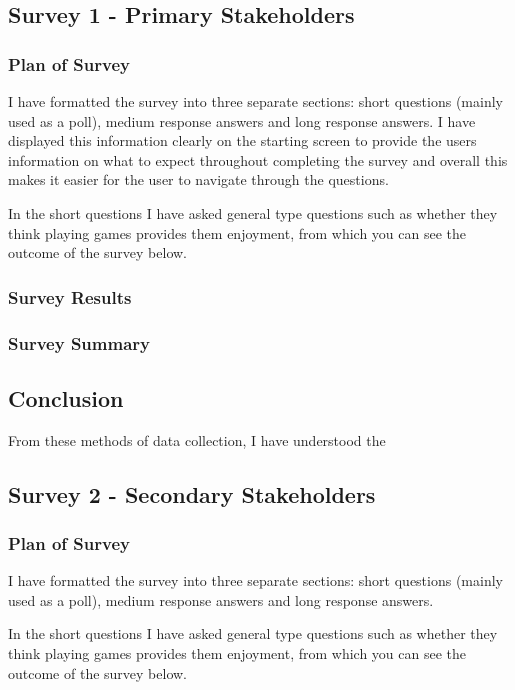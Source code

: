 \documentclass[11pt,a4paper]{report}
\begin{document}
\subsection{Survey 1 - Primary Stakeholders}

\subsubsection{Plan of Survey}

I have formatted the survey into three separate sections: short questions (mainly used as a poll), medium response answers and long response answers. I have displayed this information clearly on the starting screen to provide the users information on what to expect throughout completing the survey and overall this makes it easier for the user to navigate through the questions.

In the short questions I have asked general type questions such as whether they think playing games provides them enjoyment, from which you can see the outcome of the survey below.

\subsubsection{Survey Results}


\subsubsection{Survey Summary}


\subsection{Conclusion}
From these methods of data collection, I have understood the




\subsection{Survey 2 - Secondary Stakeholders}

\subsubsection{Plan of Survey}

I have formatted the survey into three separate sections: short questions (mainly used as a poll), medium response answers and long response answers.

In the short questions I have asked general type questions such as whether they think playing games provides them enjoyment, from which you can see the outcome of the survey below.
\end{document}
